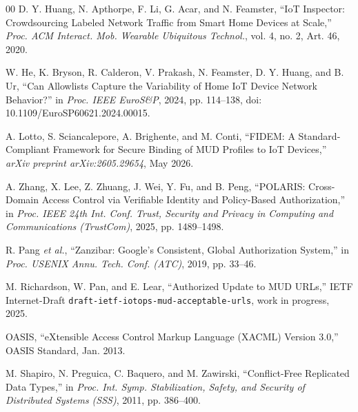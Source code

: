 \documentclass[journal]{IEEEtran}
\theoremstyle{definition}
\begin{document}
\begin{thebibliography}{00}
 D. Y. Huang, N. Apthorpe, F. Li, G. Acar, and N. Feamster,
``IoT Inspector: Crowdsourcing Labeled Network Traffic from Smart Home Devices at
Scale,'' \emph{Proc. ACM Interact. Mob. Wearable Ubiquitous Technol.}, vol. 4,
no. 2, Art. 46, 2020.

 W. He, K. Bryson, R. Calderon, V. Prakash,
N. Feamster, D. Y. Huang, and B. Ur, ``Can Allowlists Capture the Variability
of Home IoT Device Network Behavior?'' in \emph{Proc. IEEE EuroS\&P}, 2024,
pp. 114--138, doi: 10.1109/EuroSP60621.2024.00015.

 A. Lotto, S. Sciancalepore, A. Brighente, and M. Conti, ``FIDEM: A
Standard-Compliant Framework for Secure Binding of MUD Profiles to IoT Devices,''
\emph{arXiv preprint arXiv:2605.29654}, May 2026.

 A. Zhang, X. Lee, Z. Zhuang, J. Wei, Y. Fu, and B. Peng, ``POLARIS:
Cross-Domain Access Control via Verifiable Identity and Policy-Based Authorization,''
in \emph{Proc. IEEE 24th Int. Conf. Trust, Security and Privacy in Computing and
Communications (TrustCom)}, 2025, pp. 1489--1498.

 R. Pang \emph{et al.}, ``Zanzibar: Google's Consistent, Global
Authorization System,'' in \emph{Proc. USENIX Annu. Tech. Conf. (ATC)}, 2019,
pp. 33--46.

 M. Richardson, W. Pan, and E. Lear, ``Authorized
Update to MUD URLs,'' IETF Internet-Draft
\texttt{draft-ietf-iotops-mud-acceptable-urls}, work in progress, 2025.

 OASIS, ``eXtensible Access Control Markup Language (XACML)
Version 3.0,'' OASIS Standard, Jan. 2013.

 M. Shapiro, N. Preguica, C. Baquero, and M. Zawirski,
``Conflict-Free Replicated Data Types,'' in \emph{Proc. Int. Symp. Stabilization,
Safety, and Security of Distributed Systems (SSS)}, 2011, pp. 386--400.
\end{thebibliography}
\end{document}
